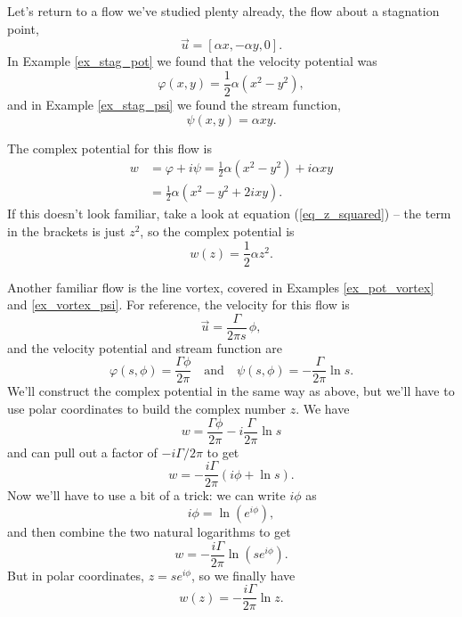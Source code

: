 \begin{example}
Let's return to a flow we've studied plenty already, the flow about a stagnation point,
\[
\vec{u} = [\alpha x, -\alpha y, 0].
\]
In Example \ref{ex_stag_pot} we found that the velocity potential was
\[
\varphi (x, y) = \frac{1}{2} \alpha (x^2 - y^2),
\]
and in Example \ref{ex_stag_psi} we found the stream function,
\[
\psi(x, y) = \alpha xy.
\]

The complex potential for this flow is
\[
\begin{split}
w & = \varphi + i\psi = \frac{1}{2} \alpha (x^2 - y^2) + i\alpha xy \\
& = \frac{1}{2} \alpha ( x^2 - y^2 + 2ixy ).
\end{split}
\]
If this doesn't look familiar, take a look at equation (\ref{eq_z_squared}) -- the term in the brackets is just $z^2$, so the complex potential is
\begin{equation}
w(z) = \frac{1}{2} \alpha z^2.
\end{equation}

\end{example}


\begin{example}
\label{ex_line_vortex_w}
Another familiar flow is the line vortex, covered in Examples \ref{ex_pot_vortex} and \ref{ex_vortex_psi}.  For reference, the velocity for this flow is
\[
\vec{u} = \frac{\Gamma}{2\pi s} \, \unit{\phi},
\]
and the velocity potential and stream function are
\[
\varphi(s, \phi) = \frac{\Gamma \phi}{2\pi} \quad \text{and} \quad \psi(s, \phi) = -\frac{\Gamma}{2\pi} \ln s.
\]
We'll construct the complex potential in the same way as above, but we'll have to use polar coordinates to build the complex number $z$.  We have
\[
w = \frac{\Gamma \phi}{2\pi}  -i\frac{\Gamma}{2\pi} \ln s
\]
and can pull out a factor of $-i\Gamma / 2 \pi$ to get
\[
w = -\frac{i\Gamma}{2\pi} \left( i\phi + \ln s \right).
\]
Now we'll have to use a bit of a trick:  we can write $i\phi$ as
\[
i\phi = \ln \left( e^{i\phi} \right),
\]
and then combine the two natural logarithms to get
\[
w = -\frac{i\Gamma}{2\pi} \ln \left( s e^{i\phi} \right).
\]
But in polar coordinates, $z = s e^{i\phi}$, so we finally have
\begin{equation}
w(z) = -\frac{i\Gamma}{2\pi} \ln z.
\end{equation}

\end{example}

